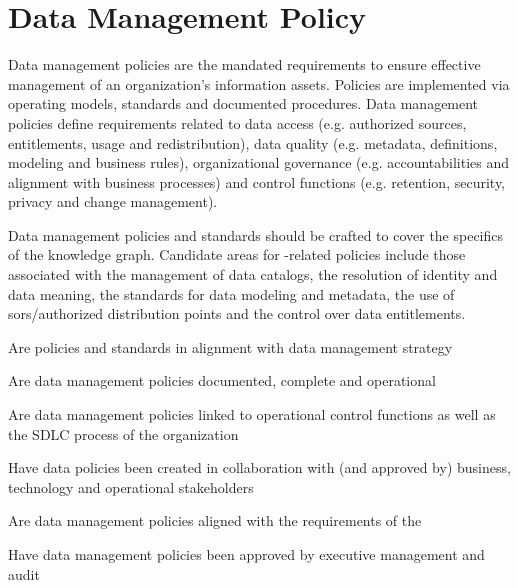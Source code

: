 \section{Data Management Policy}\label{sec:ekgmm-b-4-2} %

Data management policies are the mandated requirements to ensure effective management of an organization’s
information assets.
Policies are implemented via operating models, standards and documented procedures.
Data management policies define requirements related to data access (e.g. authorized sources, entitlements,
usage and redistribution), data quality (e.g. metadata, definitions, modeling and business rules),
organizational governance (e.g. accountabilities and alignment with business processes) and
control functions (e.g. retention, security, privacy and change management).

\kgmmekgrationalesection

Data management policies and standards should be crafted to cover the specifics of the knowledge graph.
Candidate areas for -related policies include those associated with the management of data catalogs,
the resolution of identity and data meaning, the standards for data modeling and metadata,
the use of \glspl{sor}/authorized distribution points and the control over data entitlements.

\kgmmcorequestionssection

\begin{core-questions}

  \item [\thesection.1] Are policies and standards in alignment with data management strategy
  \item [\thesection.2] Are data management policies documented, complete and operational
  \item [\thesection.3] Are data management policies linked to operational control functions as well as the
                        SDLC process of the organization
  \item [\thesection.4] Have data policies been created in collaboration with (and approved by) business, technology
                        and operational stakeholders
  \item [\thesection.5] Are data management policies aligned with the requirements of the 
  \item [\thesection.6] Have data management policies been approved by executive management and audit

\end{core-questions}

